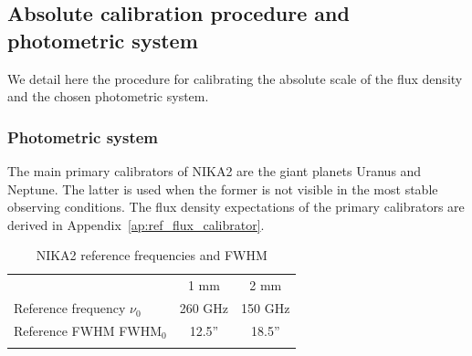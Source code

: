 \subsection{Absolute calibration procedure and photometric system}
\label{se:calibration_method}

We detail here the procedure for calibrating the absolute scale of
the flux density and the chosen photometric system.

\subsubsection{Photometric system}
\label{se:photometric_system}

The main primary calibrators of NIKA2 are the giant planets Uranus and
Neptune. The latter is used when the former is not visible in the most
stable observing conditions. The flux density expectations of the
primary calibrators are derived in Appendix~\ref{ap:ref_flux_calibrator}. 
%
\begin{table}[!htbp]
\caption{NIKA2 reference frequencies and FWHM}
\label{tab:definitions}
\centering     
\begin{tabular}{lcc}
\hline\hline
      \noalign{\smallskip}
      & 1 mm & 2 mm \\
      \noalign{\smallskip}
      \hline
      \noalign{\smallskip}
      Reference frequency $\nu_{0}$ & 260 GHz & 150 GHz \\
      Reference FWHM  FWHM$_{0}$    & 12.5'' & 18.5'' \\
      \noalign{\smallskip}
      \hline
\end{tabular}
\end{table}

